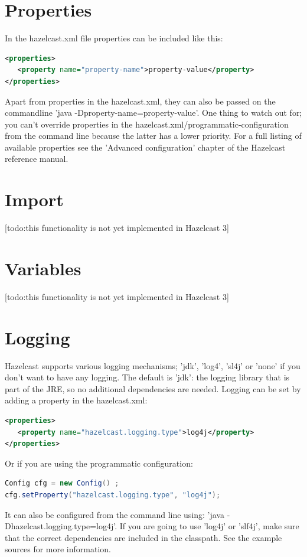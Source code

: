 \section{Properties}
In the hazelcast.xml file properties can be included like this:
\begin{lstlisting}[language=xml]
<properties>
   <property name="property-name">property-value</property>
</properties>
\end{lstlisting}
Apart from properties in the hazelcast.xml, they can also be passed on the commandline 'java -Dproperty-name=property-value'. One thing to watch out for; you can't override properties in the hazelcast.xml/programmatic-configuration from the command line because the latter has a lower priority. For a full listing of available properties see the 'Advanced configuration' chapter of the Hazelcast reference manual.

\section{Import}
[todo:this functionality is not yet implemented in Hazelcast 3]

\section{Variables}
[todo:this functionality is not yet implemented in Hazelcast 3]

\section{Logging}
Hazelcast supports various logging mechanisms; 'jdk', 'log4', 'sl4j' or 'none' if you don't want to have any logging. The default is 'jdk': the logging library that is part of the JRE, so no additional dependencies are needed. Logging can be set by adding a property in the hazelcast.xml:
\begin{lstlisting}[language=xml]
<properties>
   <property name="hazelcast.logging.type">log4j</property>
</properties>
\end{lstlisting}
Or if you are using the programmatic configuration:
\begin{lstlisting}[language=java]
Config cfg = new Config() ;
cfg.setProperty("hazelcast.logging.type", "log4j");
\end{lstlisting}
It can also be configured from the command line using: 'java -Dhazelcast.logging.type=log4j'. If you are going to use 'log4j' or 'slf4j', make sure that the correct dependencies are included in the classpath. See the example sources for more information.


